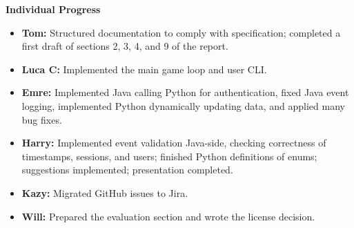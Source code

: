 \documentclass[11pt]{article}
\begin{document}
    \textbf{Individual Progress}
    \begin{itemize}
        \item \textbf{Tom:} Structured documentation to comply with specification; completed a first draft of sections 2, 3, 4, and 9 of the report.

        \item \textbf{Luca C:} Implemented the main game loop and user CLI.

        \item \textbf{Emre:} Implemented Java calling Python for authentication, fixed Java event logging, implemented Python dynamically updating data, and applied many bug fixes.

        \item \textbf{Harry:} Implemented event validation Java-side, checking correctness of timestamps, sessions, and users; finished Python definitions of enums; suggestions implemented; presentation completed.

        \item \textbf{Kazy:} Migrated GitHub issues to Jira.

        \item \textbf{Will:} Prepared the evaluation section and wrote the license decision.
    \end{itemize}
\end{document}
